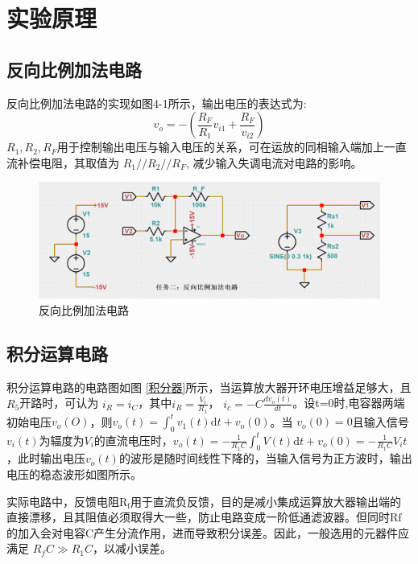 \documentclass[a4paper]{article}
\theoremstyle{definition}
\theoremstyle{plain}
\theoremstyle{remark}
\newcommand{\reffig}[1]{图 \ref{#1}}
\begin{document}
\clearpage

\section{实验原理}
\subsection{反向比例加法电路}
反向比例加法电路的实现如图4-1所示，输出电压的表达式为:
\begin{equation}
	v_{o}=-(\frac{R_{F}}{R_1}v_{i1}+\frac{R_{F}}{v_{i2}})
\end{equation}
$R_1, R_2, R_{F}$用于控制输出电压与输入电压的关系，可在运放的同相输入端加上一直流补偿电阻，其取值为 $R_1//R_2//R_{F}$, 减少输入失调电流对电路的影响。

\begin{figure}[H]
	\centering
	\includegraphics[width=1\textwidth]{反向比例加法电路}
	\caption{反向比例加法电路}
\end{figure}

\subsection{积分运算电路}
积分运算电路的电路图如\reffig{积分器}所示，当运算放大器开环电压增益足够大，且 $R_5$开路时，可认为 $i_{R}=i_{C}$，其中$i_R=\frac{V_i}{R_1}$， $i_c=-C \frac{dv_o(t)}{dt}$。设t=0时,电容器两端初始电压$v_o(O)$，则$v_o (t)=\int_{0}^{t} v_1(t) \mathrm{d}t+v_{o}(0)$。当 $v_o(0)=0$且输入信号$v_i(t)$为辐度为$V_i$的直流电压时，$v_o(t)=-\frac{1}{R_1C} \int_{0}^{t} V(t) \mathrm{d}t+v_o(0)=-\frac{1}{R_1C}V_it$，此时输出电压$v_o(t)$的波形是随时间线性下降的，当输入信号为正方波时，输出电压的稳态波形如图所示。

实际电路中，反馈电阻$\mathrm{R_f}$用于直流负反馈，目的是减小集成运算放大器输出端的直接漂移，且其阻值必须取得大一些，防止电路变成一阶低通滤波器。但同时$\mathrm{Rf}$的加入会对电容C产生分流作用，进而导致积分误差。因此，一般选用的元器件应满足 $R_{f}C \gg R_1C$，以减小误差。
\end{document}
